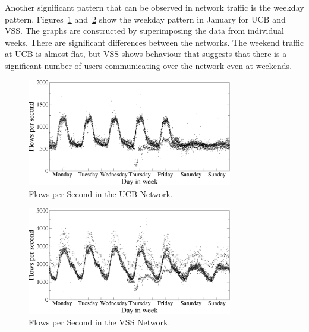 Another significant pattern that can be observed in network traffic is the weekday pattern. Figures~\ref{fig:characterization-flows-week-ukb-jan} and~\ref{fig:characterization-flows-week-vss-jan} show the weekday pattern in January for UCB and VSS. The graphs are constructed by superimposing the data from individual weeks. There are significant differences between the networks. The weekend traffic at UCB is almost flat, but VSS shows behaviour that suggests that there is a significant number of users communicating over the network even at weekends.
%
\begin{figure}[!t]
        \begin{center}
                \includegraphics[width=0.8\textwidth]{figures/paper-characterization/flows-week-ukb-jan}
                \caption{Flows per Second in the UCB Network.} \label{fig:characterization-flows-week-ukb-jan}
        \end{center}
\end{figure}

\begin{figure}[!htb]
        \begin{center}
                \includegraphics[width=0.8\textwidth]{figures/paper-characterization/flows-week-vss-jan}
                \caption{Flows per Second in the VSS Network.} \label{fig:characterization-flows-week-vss-jan}
        \end{center}
        \vspace{-1mm}
\end{figure}

